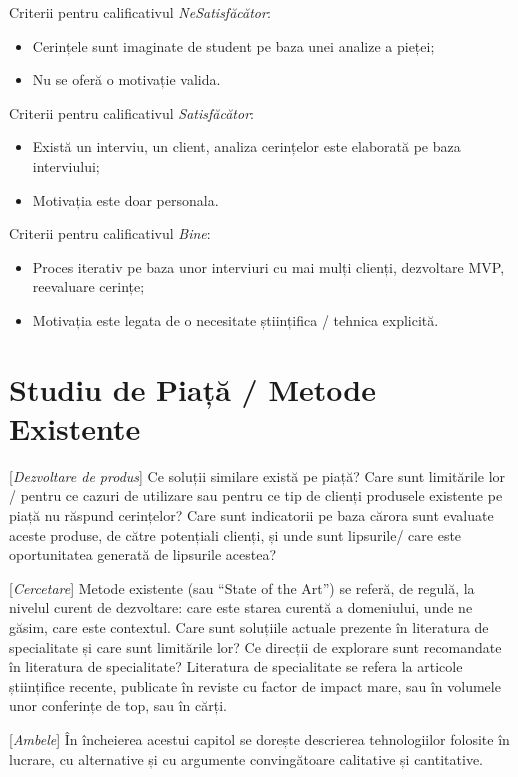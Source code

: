 \documentclass[12pt,a4paper]{report}
\newcommand{\worktype}[1]{[\textit{#1}] }
\newcommand{\dezvoltare}{\worktype{Dezvoltare de produs}}
\newcommand{\cercetare}{\worktype{Cercetare}}
\newcommand{\ambele}{\worktype{Ambele}}
\begin{document}
Criterii pentru calificativul \textit{Ne\textit{Satisfăcător}}:
\begin{itemize}
    \item \dezvoltare Cerințele sunt imaginate de student pe baza unei analize a pieței;
    \item \cercetare Nu se oferă o motivație valida.
\end{itemize}

Criterii pentru calificativul \textit{Satisfăcător}:
\begin{itemize}
    \item \dezvoltare Există un interviu, un client, analiza cerințelor este elaborată pe baza interviului;
    \item \cercetare Motivația este doar personala.
\end{itemize}


Criterii pentru calificativul \textit{Bine}:
\begin{itemize}
    \item	 \dezvoltare Proces iterativ pe baza unor interviuri cu mai mulți clienți, dezvoltare MVP, reevaluare cerințe;
    \item	 \cercetare Motivația este legata de o necesitate științifica / tehnica explicită.
\end{itemize}


\chapter{Studiu de Piață / Metode Existente}
\dezvoltare Ce soluții similare există pe piață? Care sunt limitările lor / pentru ce cazuri de utilizare sau pentru ce tip de clienți produsele existente pe piață nu răspund cerințelor? Care sunt indicatorii pe baza cărora sunt evaluate aceste produse, de către potențiali clienți, și unde sunt lipsurile/ care este oportunitatea generată de lipsurile acestea?

\cercetare Metode existente (sau ``State of the Art'') se referă, de regulă, la nivelul curent de dezvoltare: care este starea curentă a domeniului, unde ne găsim, care este contextul. Care sunt soluțiile actuale prezente în literatura de specialitate și care sunt limitările lor? Ce direcții de explorare sunt recomandate în literatura de specialitate? Literatura de specialitate se refera la articole științifice recente, publicate în reviste cu factor de impact mare, sau în volumele unor conferințe de top, sau în cărți.

\ambele În încheierea acestui capitol se dorește descrierea tehnologiilor folosite în lucrare, cu alternative și cu argumente convingătoare calitative și cantitative.
\end{document}
